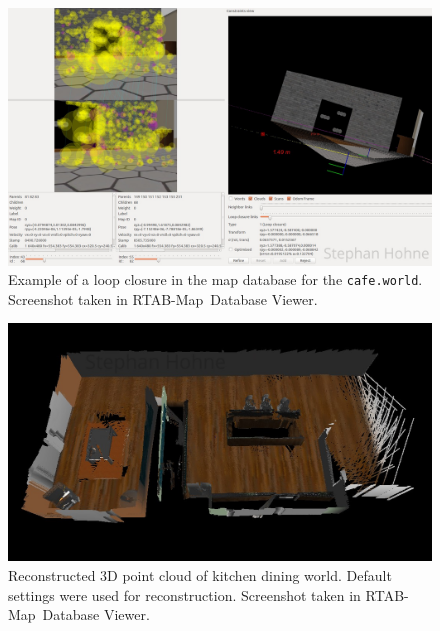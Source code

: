 \documentclass[10pt, journal, compsoc]{IEEEtran}
\newcommand{\rtab}{RTAB-Map}
\begin{document}
\begin{figure}[thpb]
      \centering
      \includegraphics[width=\textwidth]{images/loop_closure_cafe.jpg}
      \caption{Example of a loop closure in the map database for the \texttt{cafe.world}. Screenshot taken in \rtab\ Database Viewer.}
      \label{fig:loop_closure_cafe}
\end{figure}

\begin{figure}[thpb]
      \centering
      \includegraphics[width=\textwidth]{images/3D_point_cloud_kitchen_dining_settings_default.jpg}
      \caption{Reconstructed 3D point cloud of kitchen dining world. Default settings were used for reconstruction. Screenshot taken in \rtab\ Database Viewer.}
      \label{fig:3d_point_cloud_kitchen_dining_default}
\end{figure}
\end{document}
